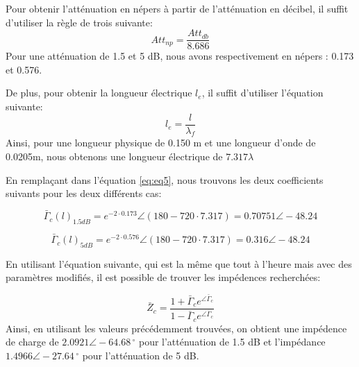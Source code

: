 Pour obtenir l'atténuation en népers à partir de l'atténuation en décibel, il suffit d'utiliser la règle de trois suivante:
\begin{equation}
    Att_{np} = \frac{Att_{db}}{8.686}
\end{equation}
Pour une atténuation de 1.5 et 5 dB, nous avons respectivement en népers : 0.173 et 0.576.

De plus, pour obtenir la longueur électrique $l_e$, il suffit d'utiliser l'équation suivante:
\begin{equation}
    l_e = \frac{l}{\lambda_f}
\end{equation}
Ainsi, pour une longueur physique de 0.150 m et une longueur d'onde de 0.0205m, nous obtenons une longueur électrique de $7.317\lambda$

En remplaçant dans l'équation \ref{eq:eq5}, nous trouvons les deux coefficients suivants pour les deux différents cas:

\begin{equation}
    \bar{\Gamma}_c(l)_{1.5dB} = e^{-2\cdot 0.173} \angle (180 - 720\cdot 7.317) = 0.70751 \angle -48.24
\end{equation}

\begin{equation}
    \bar{\Gamma}_c(l)_{5dB} = e^{-2\cdot 0.576} \angle (180 - 720\cdot 7.317) = 0.316 \angle -48.24
\end{equation}

En utilisant l'équation suivante, qui est la même que tout à l'heure mais avec des paramètres modifiés, il est possible de trouver les impédences recherchées:

\begin{equation}
    \bar{Z}_c = \frac{1+\bar{\Gamma}_c e^{\angle \bar{\Gamma}_c}}{1-\bar{\Gamma}_c e^{\angle \bar{\Gamma}_c}}
\end{equation}
Ainsi, en utilisant les valeurs précédemment trouvées, on obtient une impédence de charge de $2.0921 \angle -64.68\,^{\circ}$ pour l'atténuation de 1.5 dB et l'impédance $1.4966 \angle -27.64\,^{\circ}$ pour l'atténuation de 5 dB.


